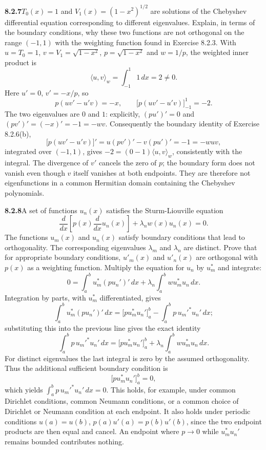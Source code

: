 \par\bigskip
\noindent\textbf{8.2.7}\quad $T_{0}(x)=1$ and $V_{1}(x)=(1-x^{2})^{1/2}$ are
solutions of the Chebyshev differential equation corresponding to different
eigenvalues. Explain, in terms of the boundary conditions, why these two
functions are not orthogonal on the range $(-1,1)$ with the weighting function
found in Exercise 8.2.3.
\solution
With $u=T_0=1$, $v=V_1=\sqrt{1-x^2}$, $p=\sqrt{1-x^2}$ and
$w=1/p$, the weighted inner product is
\[
\boxed{\langle u,v\rangle_w=\int_{-1}^{1}1\,dx=2\ne0}.
\]
Here $u'=0$, $v'=-x/p$, so
\[
p(uv'-u'v)=-x,
\qquad \bigl[p(uv'-u'v)\bigr]_{-1}^{1}=-2.
\]
The two eigenvalues are $0$ and $1$: explicitly,
$(pu')'=0$ and $(pv')'=(-x)'=-1=-wv$.
Consequently the boundary identity of Exercise 8.2.6(b),
\[
\bigl[p(uv'-u'v)\bigr]'=u(pv')'-v(pu')'=-1=-wuv,
\]
integrated over $(-1,1)$, gives
$-2=(0-1)\langle u,v\rangle_w$, consistently with the integral.
The divergence of $v'$ cancels the zero of $p$; the boundary form
does not vanish even though $v$ itself vanishes at both endpoints.
They are therefore not eigenfunctions in a common Hermitian domain
containing the Chebyshev polynomials.


\par\bigskip
\noindent\textbf{8.2.8}\quad A set of functions $u_{n}(x)$ satisfies the
Sturm-Liouville equation
\[
\frac{d}{dx}\left[p(x)\frac{d}{dx}u_{n}(x)\right]+\lambda_{n}w(x)u_{n}(x)=0.
\]
The functions $u_{m}(x)$ and $u_{n}(x)$ satisfy boundary conditions that lead
to orthogonality. The corresponding eigenvalues $\lambda_{m}$ and
$\lambda_{n}$ are distinct. Prove that for appropriate boundary conditions,
$u'_{m}(x)$ and $u'_{n}(x)$ are orthogonal with $p(x)$ as a weighting
function.
\solution
Multiply the equation for $u_n$ by $u_m^*$ and integrate:
\[
0=\int_a^b u_m^*(pu_n')'\,dx
 +\lambda_n\int_a^b wu_m^*u_n\,dx.
\]
Integration by parts, with $u_m^*$ differentiated, gives
\[
\int_a^b u_m^*(pu_n')'\,dx
=\bigl[pu_m^*u_n'\bigr]_a^b-\int_a^b p\,u_m'^*u_n'\,dx;
\]
substituting this into the previous line gives the exact identity
\[
\boxed{\int_a^b p\,u_m'^*u_n'\,dx
=\bigl[pu_m^*u_n'\bigr]_a^b
 +\lambda_n\int_a^b wu_m^*u_n\,dx}.
\]
For distinct eigenvalues the last integral is zero by the assumed
orthogonality.  Thus the additional sufficient boundary condition is
\[
\bigl[pu_m^*u_n'\bigr]_a^b=0,
\]
which yields $\int_a^b p\,u_m'^*u_n'\,dx=0$.
This holds, for example, under common Dirichlet conditions, common
Neumann conditions, or a common choice of Dirichlet or Neumann
condition at each endpoint.  It also holds under periodic conditions
$u(a)=u(b)$, $p(a)u'(a)=p(b)u'(b)$, since the two endpoint products
are then equal and cancel.  An endpoint where $p\to0$ while
$u_m^*u_n'$ remains bounded contributes nothing.

